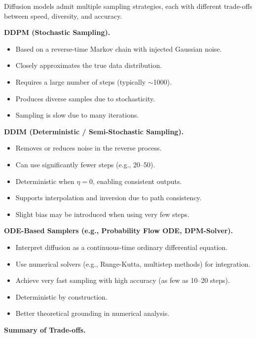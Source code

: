 Diffusion models admit multiple sampling strategies, each with different trade-offs between speed, diversity, and accuracy.

\vspace{0.5em}
\noindent
\textbf{DDPM (Stochastic Sampling).}
\begin{itemize}
    \item Based on a reverse-time Markov chain with injected Gaussian noise.
    \item Closely approximates the true data distribution.
    \item Requires a large number of steps (typically $\sim$1000).
    \item Produces diverse samples due to stochasticity.
    \item Sampling is slow due to many iterations.
\end{itemize}

\vspace{0.5em}
\noindent
\textbf{DDIM (Deterministic / Semi-Stochastic Sampling).}
\begin{itemize}
    \item Removes or reduces noise in the reverse process.
    \item Can use significantly fewer steps (e.g., 20--50).
    \item Deterministic when $\eta = 0$, enabling consistent outputs.
    \item Supports interpolation and inversion due to path consistency.
    \item Slight bias may be introduced when using very few steps.
\end{itemize}

\vspace{0.5em}
\noindent
\textbf{ODE-Based Samplers (e.g., Probability Flow ODE, DPM-Solver).}
\begin{itemize}
    \item Interpret diffusion as a continuous-time ordinary differential equation.
    \item Use numerical solvers (e.g., Runge-Kutta, multistep methods) for integration.
    \item Achieve very fast sampling with high accuracy (as few as 10--20 steps).
    \item Deterministic by construction.
    \item Better theoretical grounding in numerical analysis.
\end{itemize}

\vspace{0.5em}
\noindent
\textbf{Summary of Trade-offs.}

